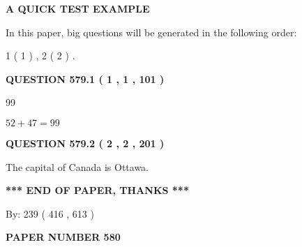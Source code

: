 \documentclass[12pt]{article}
\begin{document}
   
   
   
 \vspace{0.2in}
{\LARGE {\textbf{ A QUICK TEST EXAMPLE}}}
   
   
   
\vspace{0.2in}
   
In this paper, big questions will be generated in the following order: 
   
   
   1 ( 1 )
 ,
   2 ( 2 )
 .
  
\vspace{0.2in}
  
{\textbf{\Large{QUESTION
579.1 
 ( 1 , 1 , 101 )
}}}
  
  
 
 
\noindent{}

99
 
 
 
 
\noindent{}

$ %
52 +  %
47=   %
99$
 
 
  
\vspace{0.2in}
  
{\textbf{\Large{QUESTION
579.2 
 ( 2 , 2 , 201 )
}}}
  
  
 
 
\noindent{}
 
 
The capital of Canada is Ottawa.
 
 
 
 
   
   
 \vspace{0.2in}
 
   
   
   
   
\vspace{1.0in} 
{\textbf{\large{ *** END OF PAPER, THANKS *** }}} 
   
   
\hspace{1.0in} By: 
 239 ( 416 ,  613 )
   
   
   
   
\newpage 
\setcounter{page}{ 
   580001 } 
   
   
   
   
 {\textbf{ \Large{ PAPER NUMBER  580  }}}
   
\end{document}
